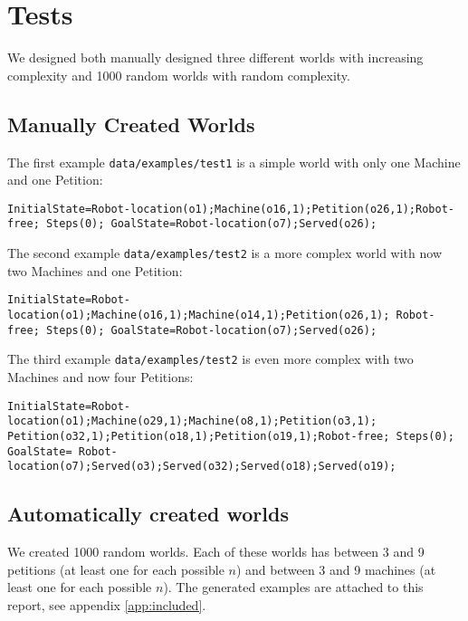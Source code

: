 \section{Tests}

We designed both manually designed three different worlds with increasing complexity and 1000 random worlds with random complexity.

\subsection{Manually Created Worlds}

The first example \texttt{data/examples/test1} is a simple world with only one Machine and one Petition:

\texttt{InitialState=Robot-location(o1);Machine(o16,1);Petition(o26,1);Robot-free; Steps(0);
GoalState=Robot-location(o7);Served(o26);}

The second example \texttt{data/examples/test2} is a more complex world with now two Machines and one Petition:

\texttt{InitialState=Robot-location(o1);Machine(o16,1);Machine(o14,1);Petition(o26,1); Robot-free; Steps(0);
GoalState=Robot-location(o7);Served(o26);}

The third example \texttt{data/examples/test2} is even more complex  with two Machines and now four Petitions:

\texttt{InitialState=Robot-location(o1);Machine(o29,1);Machine(o8,1);Petition(o3,1); Petition(o32,1);Petition(o18,1);Petition(o19,1);Robot-free; Steps(0); 
GoalState= Robot-location(o7);Served(o3);Served(o32);Served(o18);Served(o19);}


\subsection{Automatically created worlds}

We created 1000 random worlds. Each of these worlds has between 3 and 9 petitions (at least one for each possible $n$) and between 3 and 9 machines (at least one for each possible $n$). The generated examples are attached to this report, see appendix \ref{app:included}.